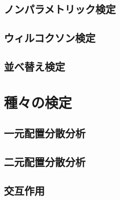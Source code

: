 \subsection{ノンパラメトリック検定}

\subsection{ウィルコクソン検定}

\subsection{並べ替え検定}

\section{種々の検定}
\label{sec:stat-various-tests}


\subsection{一元配置分散分析}

\subsection{二元配置分散分析}

\subsection{交互作用}

